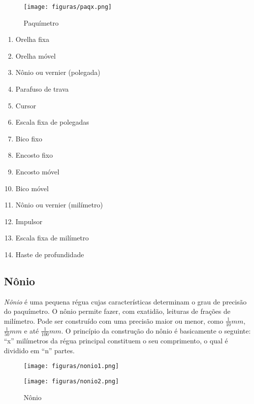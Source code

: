 \documentclass[10pt,a4paper,onecolumn,notitlepage]{scrartcl}
\begin{document}
\begin{figure}[ht]
\centering
\texttt{[image: figuras/paqx.png]} 
\caption{Paquímetro}
\label{fig:paq}
\end{figure}

\begin{multicols}{2}
\begin{enumerate}
\item Orelha fixa
\item Orelha móvel
\item Nônio ou vernier (polegada)
\item Parafuso de trava
\item Cursor
\item Escala fixa de polegadas
\item Bico fixo
\item Encosto fixo
\item Encosto móvel
\item Bico móvel
\item Nônio ou vernier (milímetro)
\item Impulsor
\item Escala fixa de milímetro
\item Haste de profundidade
\end{enumerate}
\end{multicols}

\subsection{Nônio}
\emph{Nônio} é uma pequena régua cujas características determinam o grau de precisão do paquímetro. O nônio permite fazer, com exatidão, leituras de frações de milímetro. Pode ser construído com uma precisão maior ou menor, como  $\frac{1}{10}mm$, $\frac{1}{50}mm$ e até  $\frac{1}{100}mm$. O princípio da construção do nônio é basicamente o seguinte: ``x'' milímetros da régua principal constituem o seu comprimento, o qual é dividido em ``n'' partes.


\begin{figure}[ht]
\centering
\begin{minipage}{\linewidth}
\begin{minipage}{0.4\linewidth}
\texttt{[image: figuras/nonio1.png]} 
\end{minipage}
\begin{minipage}{0.4\linewidth}
\texttt{[image: figuras/nonio2.png]} 
\end{minipage}
\end{minipage}
\caption{Nônio}
\label{fig:nonio}
\end{figure}
\end{document}
